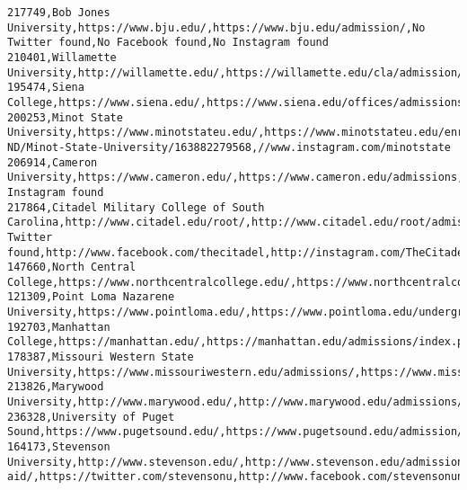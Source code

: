 \documentclass[11pt]{article}
\begin{document}
\begin{Verbatim}[commandchars=\\\{\}]
217749,Bob Jones University,https://www.bju.edu/,https://www.bju.edu/admission/,No Twitter found,No Facebook found,No Instagram found
210401,Willamette University,http://willamette.edu/,https://willamette.edu/cla/admission/index.html,https://twitter.com/willamette\_u,https://www.facebook.com/Willamette,https://www.instagram.com/p/BpZgQ0LFIPx/
195474,Siena College,https://www.siena.edu/,https://www.siena.edu/offices/admissions/,https://twitter.com/SienaCollege,https://www.facebook.com/sienacollege/,https://www.instagram.com/sienacollege/
200253,Minot State University,https://www.minotstateu.edu/,https://www.minotstateu.edu/enroll/,//twitter.com/Minotstateu,//www.facebook.com/pages/Minot-ND/Minot-State-University/163882279568,//www.instagram.com/minotstate
206914,Cameron University,https://www.cameron.edu/,https://www.cameron.edu/admissions,http://www.twitter.com/CUAggies,http://www.facebook.com/CameronUniversity,No Instagram found
217864,Citadel Military College of South Carolina,http://www.citadel.edu/root/,http://www.citadel.edu/root/admissions,No Twitter found,http://www.facebook.com/thecitadel,http://instagram.com/TheCitadel1842/
147660,North Central College,https://www.northcentralcollege.edu/,https://www.northcentralcollege.edu/apply,https://twitter.com/northcentralcol,https://www.facebook.com/NorthCentralCollege/,https://www.instagram.com/northcentralcollege/
121309,Point Loma Nazarene University,https://www.pointloma.edu/,https://www.pointloma.edu/undergraduate/admissions,https://twitter.com/plnu,https://www.facebook.com/PointLomaNazareneUniversity/,https://www.instagram.com/p/BpU6mKdHcGD/
192703,Manhattan College,https://manhattan.edu/,https://manhattan.edu/admissions/index.php,https://twitter.com/ManhattanEdu/,https://www.facebook.com/ManhattanCollegeEdu,https://www.instagram.com/manhattanedu/
178387,Missouri Western State University,https://www.missouriwestern.edu/admissions/,https://www.missouriwestern.edu/admissions/,https://twitter.com/missouriwestern,https://www.facebook.com/MissouriWestern,https://www.instagram.com/missouriwesternstateuniversity/
213826,Marywood University,http://www.marywood.edu/,http://www.marywood.edu/admissions/index.html,http://twitter.com/marywooduadm,https://www.facebook.com/marywooduadmissions,http://www.instagram.com/marywooduniversity
236328,University of Puget Sound,https://www.pugetsound.edu/,https://www.pugetsound.edu/admission/,http://www.twitter.com/univpugetsound,http://www.facebook.com/univpugetsound,http://instagram.com/univpugetsound
164173,Stevenson University,http://www.stevenson.edu/,http://www.stevenson.edu/admissions-aid/,https://twitter.com/stevensonu,http://www.facebook.com/stevensonuniversity,http://instagram.com/stevensonuniversity\#

\end{Verbatim}
\end{document}
